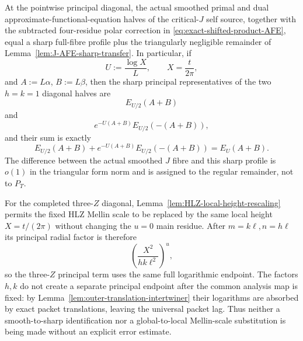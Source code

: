 \begin{proposition}
\label{prop:J-full-fibre}
At the pointwise principal diagonal, the actual smoothed primal and dual
approximate-functional-equation halves of the critical-$J$ self source,
together with the subtracted four-residue polar correction in
\eqref{eq:exact-shifted-product-AFE}, equal a sharp full-fibre profile plus the
triangularly negligible remainder of
Lemma~\ref{lem:J-AFE-sharp-transfer}.  In particular, if
\[
U:=\frac{\log X}{L},
\qquad X=\frac{t}{2\pi},
\]
and $A:=L\alpha$, $B:=L\beta$, then the sharp principal representatives of the
two $h=k=1$ diagonal halves are
\[
E_{U/2}(A+B)
\]
and
\[
e^{-U(A+B)}E_{U/2}(-(A+B)),
\]
and their sum is exactly
\begin{equation}
\boxed{
E_{U/2}(A+B)
+e^{-U(A+B)}E_{U/2}(-(A+B))
=E_U(A+B).
}
\label{eq:J-half-glue}
\end{equation}
The difference between the actual smoothed $J$ fibre and this sharp profile is
$o(1)$ in the triangular form norm and is assigned to the regular remainder,
not to $P_T$.

For the completed three-$Z$ diagonal, Lemma~\ref{lem:HLZ-local-height-rescaling}
permits the fixed HLZ Mellin scale to be replaced by the same local height
$X=t/(2\pi)$ without changing the $u=0$ main residue.  After
$m=k\ell,n=h\ell$ its principal radial factor is therefore
\[
\left(\frac{X^2}{hk\ell^2}\right)^u,
\]
so the three-$Z$ principal term uses the same full logarithmic endpoint.  The
factors $h,k$ do not create a separate principal endpoint after the common
analysis map is fixed: by Lemma~\ref{lem:outer-translation-intertwiner} their
logarithms are absorbed by exact packet translations, leaving the universal
packet lag.  Thus neither a smooth-to-sharp identification nor a global-to-local
Mellin-scale substitution is being made without an explicit error estimate.
\end{proposition}


